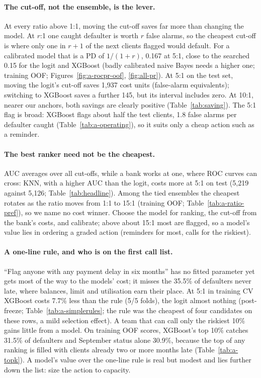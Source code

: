 \paragraph{The cut-off, not the ensemble, is the lever.}
At every ratio above 1:1, moving the cut-off saves far more than changing the model. At $r$:1 one caught defaulter is worth $r$ false alarms, so the cheapest cut-off is where only one in $r + 1$ of the next clients flagged would default. For a calibrated model that is a PD of $1/(1+r)$, 0.167 at 5:1, close to the searched 0.15 for the logit and XGBoost (badly calibrated naive Bayes needs a higher one; training OOF; Figures~\ref{fig:a-rocpr-oof}, \ref{fig:all-pr}). At 5:1 on the test set, moving the logit's cut-off saves 1,937 cost units (false-alarm equivalents); switching to XGBoost saves a further 145, but its interval includes zero. At 10:1, nearer our anchors, both savings are clearly positive (Table~\ref{tab:saving}). The 5:1 flag is broad: XGBoost flags about half the test clients, 1.8 false alarms per defaulter caught (Table~\ref{tab:a-operating}), so it suits only a cheap action such as a reminder.

\paragraph{The best ranker need not be the cheapest.}
AUC averages over all cut-offs, while a bank works at one, where ROC curves can cross: KNN, with a higher AUC than the logit, costs more at 5:1 on test (5,219 against 5,126; Table~\ref{tab:headline}). Among the tied ensembles the cheapest rotates as the ratio moves from 1:1 to 15:1 (training OOF; Table~\ref{tab:a-ratio-pref}), so we name no cost winner. Choose the model for ranking, the cut-off from the bank's costs, and calibrate; above about 15:1 most are flagged, so a model's value lies in ordering a graded action (reminders for most, calls for the riskiest).

\paragraph{A one-line rule, and who is on the first call list.}
``Flag anyone with any payment delay in six months'' has no fitted parameter yet gets most of the way to the models' cost; it misses the 35.5\% of defaulters never late, where balances, limit and utilisation earn their place. At 5:1 in training CV XGBoost costs 7.7\% less than the rule (5/5 folds), the logit almost nothing (post-freeze; Table~\ref{tab:a-simplerules}; the rule was the cheapest of four candidates on these rows, a mild selection effect). A team that can call only the riskiest 10\% gains little from a model. On training OOF scores, XGBoost's top 10\% catches 31.5\% of defaulters and September status alone 30.9\%, because the top of any ranking is filled with clients already two or more months late (Table~\ref{tab:a-topk}). A model's value over the one-line rule is real but modest and lies further down the list: size the action to capacity.
